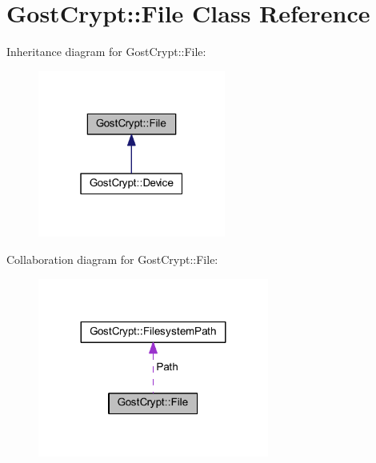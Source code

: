 \hypertarget{class_gost_crypt_1_1_file}{}\section{Gost\+Crypt\+:\+:File Class Reference}
\label{class_gost_crypt_1_1_file}


Inheritance diagram for Gost\+Crypt\+:\+:File\+:
\nopagebreak
\begin{figure}[H]
\begin{center}
\leavevmode
\includegraphics[width=175pt]{class_gost_crypt_1_1_file__inherit__graph}
\end{center}
\end{figure}


Collaboration diagram for Gost\+Crypt\+:\+:File\+:
\nopagebreak
\begin{figure}[H]
\begin{center}
\leavevmode
\includegraphics[width=215pt]{class_gost_crypt_1_1_file__coll__graph}
\end{center}
\end{figure}
